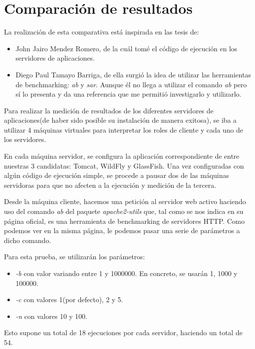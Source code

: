 \documentclass[a4paper, 10pt]{article}
\begin{document}
\section{Comparación de resultados}
	La realización de esta comparativa está inspirada en las tesis de:
		\begin{itemize}
			\item John Jairo Mendez Romero\cite{JJMR_Tesis}, de la cuál tomé el código de
			ejecución en los servidores de aplicaciones.
			
			\item Diego Paul Tamayo Barriga\cite{DPTB_Tesis}, de ella surgió la idea de utilizar
			las herramientas de benchmarking: \textit{ab} y \textit{sar}. Aunque él no llega a
			utilizar el comando \textit{ab} pero sí lo presenta y da una referencia que me
			permitió investigarlo y utilizarlo.
		\end{itemize}

	Para realizar la medición de resultados de los diferentes servidores de aplicaciones(de haber
	sido posible su instalación de manera exitosa), se iba a utilizar 4 máquinas virtuales para
	interpretar los roles de cliente y cada uno de los servidores.
	
	En cada máquina servidor, se configura la aplicación correspondiente de entre nuestras 3 
	candidatas: Tomcat, WildFly y GlassFish. Una vez configuradas con algún código de ejecución
	simple, se procede a pausar dos de las máquinas servidoras para que no afecten a la ejecución
	y medición de la tercera.
	
	Desde la máquina cliente, hacemos una petición al servidor web activo haciendo uso del comando
	\textit{ab} del paquete \textit{apache2-utils} que, tal como se nos indica en su página
	oficial\cite{AB_official}, es una herramienta de benchmarking de servidores HTTP. Como podemos
	 ver en la misma página, le podemos pasar una serie de parámetros a dicho comando.
	
	Para esta prueba, se utilizarán los parámetros:
	\begin{itemize}
		\item \textit{-b} con valor variando entre 1 y 1000000. En concreto, se usarán 1, 1000 y 100000.
		\item \textit{-c} con valores 1(por defecto), 2 y 5.
		\item \textit{-n} con valores 10 y 100.
	\end{itemize}
	
	Esto supone un total de 18 ejecuciones por cada servidor, haciendo un total de 54.
	
\end{document}
